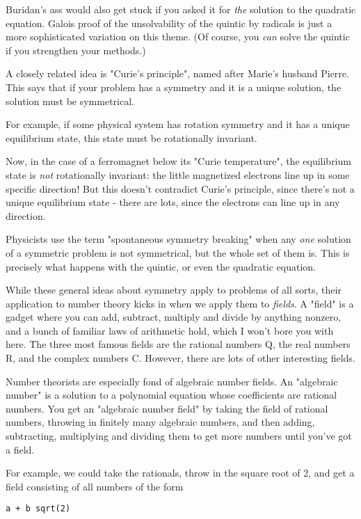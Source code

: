 Buridan's ass would also get stuck if you asked it for \emph{the} solution
to the quadratic equation.  Galois proof of the unsolvability of the 
quintic by radicals is just a more sophisticated variation on this theme.  
(Of course, you \emph{can} solve the quintic if you strengthen your methods.)

A closely related idea is "Curie's principle", named after Marie's 
husband Pierre.  This says that if your problem has a symmetry and 
it is a unique solution, the solution must be symmetrical. 

For example, if some physical system has rotation symmetry and it has a
unique equilibrium state, this state must be rotationally invariant.

Now, in the case of a ferromagnet below its "Curie temperature", the 
equilibrium state is \emph{not} rotationally invariant: the little magnetized
electrons line up in some specific direction!  But this doesn't 
contradict Curie's principle, since there's not a unique equilibrium 
state - there are lots, since the electrons can line up in any direction.  

Physicists use the term "spontaneous symmetry breaking" when any 
\emph{one}
solution of a symmetric problem is not symmetrical, but the whole set 
of them is.  This is precisely what happens with the quintic, or even 
the quadratic equation.

While these general ideas about symmetry apply to problems of all sorts,
their application to number theory kicks in when we apply them to \emph{fields}.  
A "field" is a gadget where you can add, subtract, multiply and divide
by anything nonzero, and a bunch of familiar laws of arithmetic hold, 
which I won't bore you with here.  The three most famous fields are the 
rational numbers Q, the real numbers R, and the complex numbers C.  
However, there are lots of other interesting fields.  

Number theorists are especially fond of algebraic number fields.  An 
"algebraic number" is a solution to a polynomial equation whose coefficients 
are rational numbers.  You get an "algebraic number field" by taking the 
field of rational numbers, throwing in finitely many algebraic numbers, and 
then adding, subtracting, multiplying and dividing them to get more numbers 
until you've got a field.  

For example, we could take the rationals, throw in the square root of 2, 
and get a field consisting of all numbers of the form

\begin{verbatim}
a + b sqrt(2)
\end{verbatim}
    
